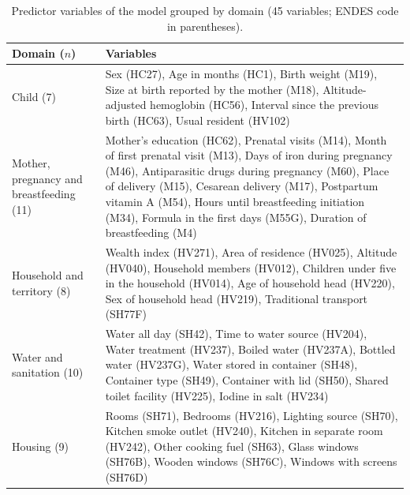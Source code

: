 \documentclass[11pt]{article}
\begin{document}
\begin{table}[h]
\caption{Predictor variables of the model grouped by domain (45 variables; ENDES code in parentheses).}
\small
\begin{tabularx}{\linewidth}{@{}p{3.4cm}L@{}}
\toprule
Domain ($n$) & Variables \\
\midrule
Child (7) & Sex (HC27), Age in months (HC1), Birth weight (M19), Size at birth reported by the mother (M18),
Altitude-adjusted hemoglobin (HC56), Interval since the previous birth (HC63), Usual resident (HV102) \\
Mother, pregnancy and breastfeeding (11) & Mother's education (HC62), Prenatal visits (M14), Month of first prenatal
visit (M13), Days of iron during pregnancy (M46), Antiparasitic drugs during pregnancy (M60), Place of delivery (M15),
Cesarean delivery (M17), Postpartum vitamin A (M54), Hours until breastfeeding initiation (M34), Formula in the first
days (M55G), Duration of breastfeeding (M4) \\
Household and territory (8) & Wealth index (HV271), Area of residence (HV025), Altitude (HV040), Household members
(HV012), Children under five in the household (HV014), Age of household head (HV220), Sex of household head (HV219),
Traditional transport (SH77F) \\
Water and sanitation (10) & Water all day (SH42), Time to water source (HV204), Water treatment (HV237), Boiled water
(HV237A), Bottled water (HV237G), Water stored in container (SH48), Container type (SH49), Container with lid (SH50),
Shared toilet facility (HV225), Iodine in salt (HV234) \\
Housing (9) & Rooms (SH71), Bedrooms (HV216), Lighting source (SH70), Kitchen smoke outlet (HV240), Kitchen in separate
room (HV242), Other cooking fuel (SH63), Glass windows (SH76B), Wooden windows (SH76C), Windows with screens (SH76D) \\
\bottomrule
\end{tabularx}
\end{table}
\end{document}
